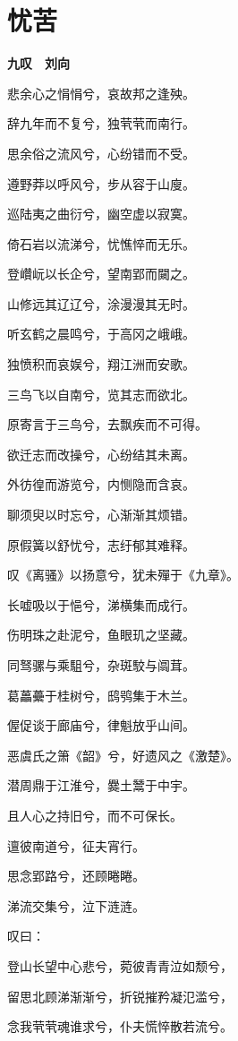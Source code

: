 \documentclass[12pt,a4paper]{ctexbook}
\begin{document}
\section{忧苦}
\textbf{九叹　刘向}\par\vspace{0.5em}
悲余心之悁悁兮，哀故邦之逢殃。\par
辞九年而不复兮，独茕茕而南行。\par
思余俗之流风兮，心纷错而不受。\par
遵野莽以呼风兮，步从容于山廋。\par
巡陆夷之曲衍兮，幽空虚以寂寞。\par
倚石岩以流涕兮，忧憔悴而无乐。\par
登巑岏以长企兮，望南郢而闚之。\par
山修远其辽辽兮，涂漫漫其无时。\par
听玄鹤之晨鸣兮，于高冈之峨峨。\par
独愤积而哀娱兮，翔江洲而安歌。\par
三鸟飞以自南兮，览其志而欲北。\par
原寄言于三鸟兮，去飘疾而不可得。\par
欲迁志而改操兮，心纷结其未离。\par
外彷徨而游览兮，内恻隐而含哀。\par
聊须臾以时忘兮，心渐渐其烦错。\par
原假簧以舒忧兮，志纡郁其难释。\par
叹《离骚》以扬意兮，犹未殫于《九章》。\par
长嘘吸以于悒兮，涕横集而成行。\par
伤明珠之赴泥兮，鱼眼玑之坚藏。\par
同驽骡与乘駔兮，杂斑駮与阘茸。\par
葛藟虆于桂树兮，鸱鸮集于木兰。\par
偓促谈于廊庙兮，律魁放乎山间。\par
恶虞氏之箫《韶》兮，好遗风之《激楚》。\par
潜周鼎于江淮兮，爨土鬵于中宇。\par
且人心之持旧兮，而不可保长。\par
邅彼南道兮，征夫宵行。\par
思念郢路兮，还顾睠睠。\par
涕流交集兮，泣下涟涟。\par
叹曰：\par
登山长望中心悲兮，菀彼青青泣如颓兮，\par
留思北顾涕渐渐兮，折锐摧矜凝氾滥兮，\par
念我茕茕魂谁求兮，仆夫慌悴散若流兮。\par
\end{document}
